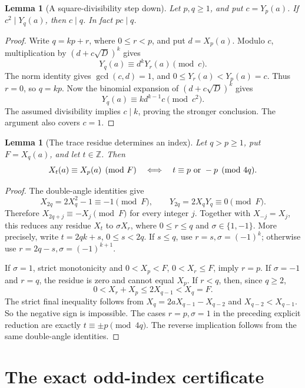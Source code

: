 \documentclass[11pt]{article}
\newtheorem{lemma}[theorem]{Lemma}
\newcommand{\Z}{\mathbb Z}\newcommand{\N}{\mathbb Z_{\ge0}}
\begin{document}
\begin{lemma}[A square-divisibility step down]\label{stepdown}
Let \(p,q\ge1\), and put \(c=Y_p(a)\).
If \(c^2\mid Y_q(a)\), then \(c\mid q\).
In fact \(pc\mid q\).
\end{lemma}
\begin{proof}
Write \(q=kp+r\), where \(0\le r<p\), and put \(d=X_p(a)\).
Modulo \(c\), multiplication by
\((d+c\sqrt D)^k\) gives
\[
               Y_q(a)\equiv d^kY_r(a)\pmod c.
\]
The norm identity gives \(\gcd(c,d)=1\), and
\(0\le Y_r(a)<Y_p(a)=c\).  Thus \(r=0\), so \(q=kp\).
Now the binomial expansion of \((d+c\sqrt D)^k\) gives
\[
               Y_q(a)\equiv k d^{k-1}c\pmod {c^2}.
\]
The assumed divisibility implies \(c\mid k\), proving the stronger
conclusion.  The argument also covers \(c=1\).
\end{proof}

\begin{lemma}[The trace residue determines an index]\label{trace}
Let \(q>p\ge1\), put \(F=X_q(a)\), and let \(t\in\Z\).
Then
\[
      X_t(a)\equiv X_p(a)\pmod F
      \quad\Longleftrightarrow\quad
      t\equiv p\ \hbox{or }-p\pmod {4q}.
\]
\end{lemma}
\begin{proof}
The double-angle identities give
\[
 X_{2q}=2X_q^2-1\equiv-1\pmod F,
 \qquad Y_{2q}=2X_qY_q\equiv0\pmod F.
\]
Therefore \(X_{2q+j}\equiv-X_j\pmod F\) for every integer \(j\).
Together with \(X_{-j}=X_j\), this reduces any residue \(X_t\)
to \(\sigma X_r\), where \(0\le r\le q\) and
\(\sigma\in\{1,-1\}\).  More precisely, write
\(t=2qk+s\), \(0\le s<2q\).  If \(s\le q\), use
\(r=s,\sigma=(-1)^k\); otherwise use
\(r=2q-s,\sigma=(-1)^{k+1}\).

If \(\sigma=1\), strict monotonicity and
\(0<X_p<F\), \(0<X_r\le F\), imply \(r=p\).
If \(\sigma=-1\) and \(r=q\), the residue is zero and cannot
equal \(X_p\).  If \(r<q\), then, since \(q\ge2\),
\[
       0<X_r+X_p\le2X_{q-1}<X_q=F.
\]
The strict final inequality follows from
\(X_q=2aX_{q-1}-X_{q-2}\) and
\(X_{q-2}<X_{q-1}\).  So the negative sign is impossible.
The cases \(r=p,\sigma=1\) in the preceding explicit reduction
are exactly \(t\equiv\pm p\pmod {4q}\).  The reverse implication
follows from the same double-angle identities.
\end{proof}

\section{The exact odd-index certificate}
\end{document}
